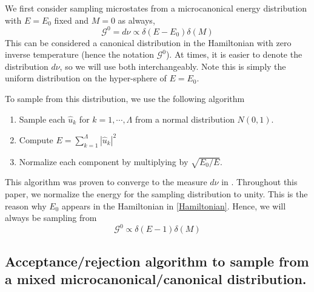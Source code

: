 \documentclass[12pt]{article}
\newcommand{\abs}[1]{\left| #1 \right|}
\newcommand{\uhat}{\hat{u}}
\newcommand{\sumk}{\sum_{k=1}^{\Lambda}}
\newcommand{\Gibbs}{\mathcal{G}}
\begin{document}
We first consider sampling microstates from a microcanonical energy distribution with $E=E_0$ fixed and $M=0$ as always,
\begin{equation}
\Gibbs^0 = d\nu \propto \delta(E-E_0) \delta(M)
\end{equation}
This can be considered a canonical distribution in the Hamiltonian with zero inverse temperature (hence the notation $\Gibbs^0$). At times, it is easier to denote the distribution $d\nu$, so we will use both interchangeably. Note this is simply the uniform distribution on the hyper-sphere of $E=E_0$.

To sample from this distribution, we use the following algorithm
\begin{enumerate}
\item Sample each $\uhat_k$ for $k=1,\cdots,\Lambda$ from a normal distribution $N(0,1)$.
\item Compute $E = \sumk \abs{\uhat_k}^2$
\item Normalize each component by multiplying by $\sqrt{E_0/E}$.
\end{enumerate}
This algorithm was proven to converge to the measure $d\nu$ in \cite{abramov2003hamiltonian}. Throughout this paper, we normalize the energy for the sampling distribution to unity. This is the reason why $E_0$ appears in the Hamiltonian in \eqref{Hamiltonian}. Hence, we will always be sampling from
\begin{equation}
\Gibbs^0 \propto \delta(E-1) \delta(M)
\end{equation}

\subsection{Acceptance/rejection algorithm to sample from a mixed microcanonical/canonical distribution.}
\label{sec_accrej}
\end{document}
